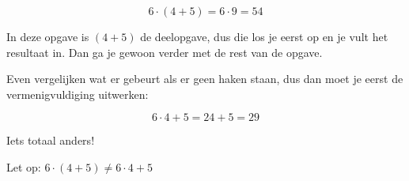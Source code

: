 \begin{voorbeeld}
\begin{equation*}
6 \cdot (4+5) = 6 \cdot 9 = 54
\end{equation*}	
	
In deze opgave is $(4 + 5)$ de deelopgave, dus die los je eerst op en je vult het resultaat in. 
Dan ga je gewoon verder met de rest van de opgave.

Even vergelijken wat er gebeurt als er geen haken staan, dus dan moet je eerst de vermenigvuldiging uitwerken:

\begin{equation*}
6 \cdot 4+5 = 24+5=29
\end{equation*}	

Iets totaal anders!

Let op: $6 \cdot (4+5) \ne 6\cdot 4+5$

\end{voorbeeld}

